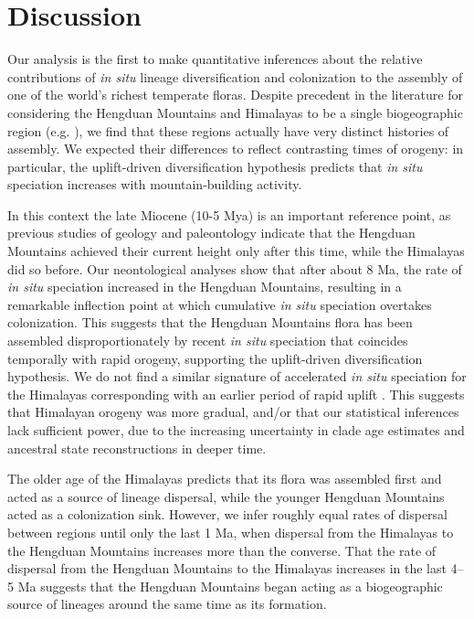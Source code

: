 \section{Discussion}

Our analysis is the first to make quantitative inferences about the relative contributions of \textit{in situ} lineage diversification and colonization to the assembly of one of the world's richest temperate floras. Despite precedent in the literature for considering the Hengduan Mountains and Himalayas to be a single biogeographic region (e.g. \citep{Zhang2014,Nie2013}), we find that these regions actually have very distinct histories of assembly. We expected their differences to reflect contrasting times of orogeny: in particular, the uplift-driven diversification hypothesis predicts that \textit{in situ} speciation increases with mountain-building activity.

In this context the late Miocene (10-5 Mya) is an important reference point, as previous studies of geology and paleontology indicate that the Hengduan Mountains achieved their current height only after this time, while the Himalayas did so before. Our neontological analyses show that after about 8 Ma, the rate of \textit{in situ} speciation increased in the Hengduan Mountains, resulting in a remarkable inflection point at which cumulative \textit{in situ} speciation overtakes colonization. This suggests that the Hengduan Mountains flora has been assembled disproportionately by recent \textit{in situ} speciation that coincides temporally with rapid orogeny, supporting the uplift-driven diversification hypothesis. We do not find a similar signature of accelerated \textit{in situ} speciation for the Himalayas corresponding with an earlier period of rapid uplift \citep{WangY2007,Mao2010}. This suggests that Himalayan orogeny was more gradual, and/or that our statistical inferences lack sufficient power, due to the increasing uncertainty in clade age estimates and ancestral state reconstructions in deeper time.

The older age of the Himalayas predicts that its flora was assembled first and acted as a source of lineage dispersal, while the younger Hengduan Mountains acted as a colonization sink. However, we infer roughly equal rates of dispersal between regions until only the last 1 Ma, when dispersal from the Himalayas to the Hengduan Mountains increases more than the converse. That the rate of dispersal from the Hengduan Mountains to the Himalayas increases in the last 4--5 Ma suggests that the Hengduan Mountains began acting as a biogeographic source of lineages around the same time as its formation.%

